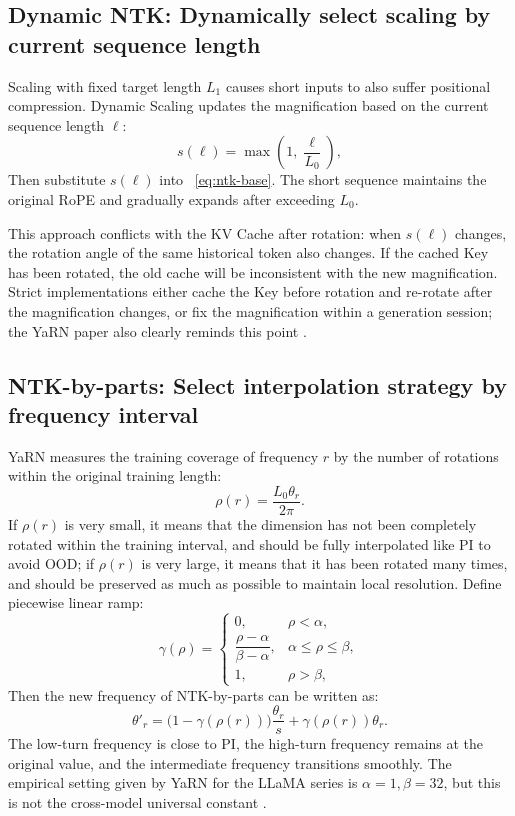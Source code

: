 \documentclass[UTF8,fontset=none,a4paper,10pt]{ctexart}
\begin{document}
\subsection{Dynamic NTK: Dynamically select scaling by current sequence length}

Scaling with fixed target length $L_1$ causes short inputs to also suffer positional compression. Dynamic Scaling updates the magnification \cite{peng2024yarn} based on the current sequence length $\ell$:
\begin{equation}
  s(\ell)=\max\left(1,\frac{\ell}{L_0}\right),
  \label{eq:dynamic-scale}
\end{equation}
Then substitute $s(\ell)$ into ~\eqref{eq:ntk-base}. The short sequence maintains the original RoPE and gradually expands after exceeding $L_0$.

This approach conflicts with the KV Cache after rotation: when $s(\ell)$ changes, the rotation angle of the same historical token also changes. If the cached Key has been rotated, the old cache will be inconsistent with the new magnification. Strict implementations either cache the Key before rotation and re-rotate after the magnification changes, or fix the magnification within a generation session; the YaRN paper also clearly reminds this point \cite{peng2024yarn}.

\subsection{NTK-by-parts: Select interpolation strategy by frequency interval}

YaRN measures the training coverage of frequency $r$ by the number of rotations within the original training length:
\begin{equation}
  \rho(r)=\frac{L_0\theta_r}{2\pi}.
  \label{eq:rotation-count}
\end{equation}
If $\rho(r)$ is very small, it means that the dimension has not been completely rotated within the training interval, and should be fully interpolated like PI to avoid OOD; if $\rho(r)$ is very large, it means that it has been rotated many times, and should be preserved as much as possible to maintain local resolution. Define piecewise linear ramp:
\begin{equation}
  \gamma(\rho)=
  \begin{cases}
    0,&\rho<\alpha,\\
    \dfrac{\rho-\alpha}{\beta-\alpha},&\alpha\le\rho\le\beta,\\
    1,&\rho>\beta,
  \end{cases}
  \label{eq:ramp}
\end{equation}
Then the new frequency of NTK-by-parts can be written as:
\begin{equation}
  \theta'_r=
  \bigl(1-\gamma(\rho(r))\bigr)\frac{\theta_r}{s}
  +\gamma(\rho(r))\theta_r.
  \label{eq:ntk-by-parts}
\end{equation}
The low-turn frequency is close to PI, the high-turn frequency remains at the original value, and the intermediate frequency transitions smoothly. The empirical setting given by YaRN for the LLaMA series is $\alpha=1,\beta=32$, but this is not the cross-model universal constant \cite{peng2024yarn}.
\end{document}
